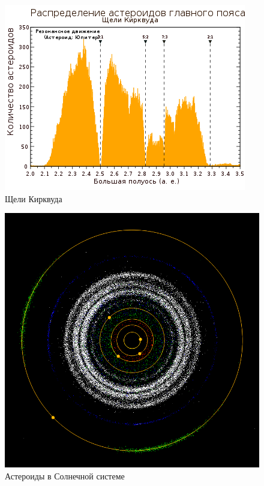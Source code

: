 \begin{figure}[H]
\centering
\includegraphics[scale=0.6]{img/gaps.png}
\caption{Щели Кирквуда}

\end{figure}

\begin{figure}[H]
\centering
\includegraphics[scale=0.25]{img/gaps2.png}
\caption{Астероиды в Солнечной системе} 

\end{figure}

